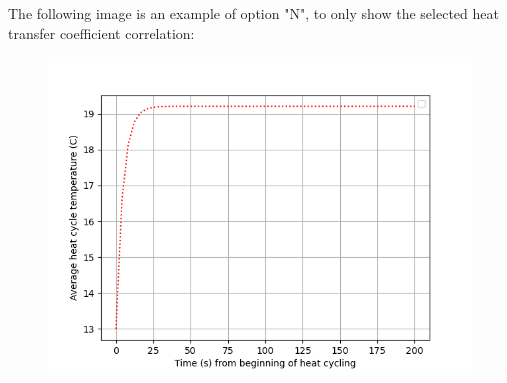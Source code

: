 \documentclass[a4paper,12pt]{article}
\begin{document}
\clearpage

The following image is an example of option "N", to only show the selected heat transfer coefficient correlation:

\begin{center}
\begin{figure}[h]
\centering
\includegraphics{tutorialimage6.png}
\end{figure}
\end{center}
\end{document}
